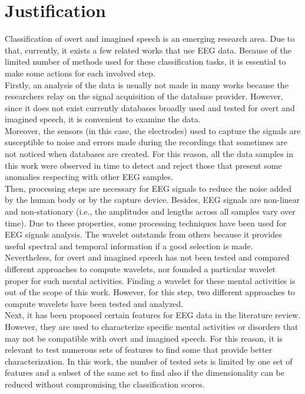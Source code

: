 \section{Justification}
Classification of overt and imagined speech is an emerging research area. Due to that, currently, it exists a few related works that use EEG data. Because of the limited number of methods used for these classification tasks, it is essential to make some actions for each involved step.\\

Firstly, an analysis of the data is usually not made in many works because the researchers relay on the signal acquisition of the database provider. However, since it does not exist currently databases broadly used and tested for overt and imagined speech, it is convenient to examine the data.\\

Moreover, the sensors (in this case, the electrodes) used to capture the signals are susceptible to noise and errors made during the recordings that sometimes are not noticed when databases are created. For this reason, all the data samples in this work were observed in time to detect and reject those that present some anomalies respecting with other EEG samples.\\

Then, processing steps are necessary for EEG signals to reduce the noise added by the human body or by the capture device. Besides, EEG signals are non-linear and non-stationary (i.e., the amplitudes and lengths across all samples vary over time). Due to these properties, some processing techniques have been used for EEG signals analysis. The wavelet outstands from others because it provides useful spectral and temporal information if a good selection is made.\\

Nevertheless, for overt and imagined speech has not been tested and compared different approaches to compute wavelets, nor founded a particular wavelet proper for such mental activities. Finding a wavelet for these mental activities is out of the scope of this work. However, for this step, two different approaches to compute wavelets have been tested and analyzed.\\

Next, it has been proposed certain features for EEG data in the literature review. However, they are used to characterize specific mental activities or disorders that may not be compatible with overt and imagined speech. For this reason, it is relevant to test numerous sets of features to find some that provide better characterization. In this work, the number of tested sets is limited by one set of features and a subset of the same set to find also if the dimensionality can be reduced without compromising the classification scores.\\

